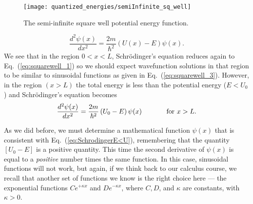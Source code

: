 \begin{figure}[!t]
\begin{center}
\texttt{[image: quantized\_energies/semiInfinite\_sq\_well]}
\end{center}
\caption{The semi-infinite square well potential energy function.}
\label{fig:semiInfiniteSquareWell}
\end{figure}

\begin{equation}
\frac{d^2\psi(x)}{dx^2}  = \frac{2m}{\hbar^2}\left(U(x)-E\right)\psi(x).
\end{equation}
We see that in the region $0 < x < L$, Schr\"odinger's equation reduces
again to Eq.~(\ref{eq:squarewell_1}) so we should expect wavefunction
solutions in that region to be similar to sinusoidal functions as
given in Eq.~(\ref{eq:squarewell_3}).  However, in the region $(x >
L)$ the total energy is less than the potential energy ($E < U_0$)
and Schr\"odinger's equation becomes
\begin{equation}
\frac{d^2\psi(x)}{dx^2} =
\frac{2m}{\hbar^2}\left(U_0-E\right)\psi(x) \hspace{0.5in}\mbox{for  $x > L$}.
\label{eq:SchrodingerE<U}
\end{equation}

As we did before, we must determine a mathematical function $\psi(x)$
that is consistent with Eq.~(\ref{eq:SchrodingerE<U}),
remembering that the quantity $\left[U_0 - E\right]$ is a positive
quantity.  This time the second derivative of $\psi(x)$ is equal to a
{\it positive} number times the same function.  In this case,
sinusoidal functions will not work, but again, if we think back to our
calculus course, we recall that another set of functions we know is
the right choice here --- the exponential functions $C e^{+\kappa x}$
and $D e^{-\kappa x}$, where $C, D$, and $\kappa$ are constants,
with $\kappa > 0$.

